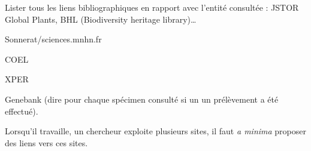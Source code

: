 \startchapter[title={Liens vers des outils tiers}]

\startTODO
\startitemize
	\item
	Lister tous les liens bibliographiques en rapport avec l'entité consultée : JSTOR Global Plants, BHL (Biodiversity heritage library)\dots
	\item Sonnerat/sciences.mnhn.fr
	\item COEL
	\item XPER
	\item Genebank (dire pour chaque spécimen consulté si un un prélèvement a été effectué).
	\item Lorsqu'il travaille, un chercheur exploite plusieurs sites, il faut {\it a minima} proposer des liens vers ces sites.
\stopitemize
\stopTODO